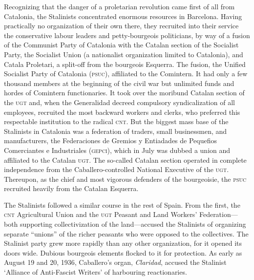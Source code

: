 Recognizing that the danger of a proletarian revolution came first of all from Catalonia, the Stalinists concentrated enormous resources in Barcelona. Having practically no organization of their own there, they recruited into their service the conservative labour leaders and petty-bourgeois politicians, by way of a fusion of the Communist Party of Catalonia with the Catalan section of the Socialist Party, the {Socialist Union} (a nationalist organization limited to Catalonia), and {Catala Proletari}, a split-off from the bourgeois Esquerra. The fusion, the {Unified Socialist Party of Catalonia} ({\textsc{psuc}}), affiliated to the Comintern. It had only a few thousand members at the beginning of the civil war but unlimited funds and hordes of Comintern functionaries. It took over the moribund Catalan section of the \textsc{ugt} and, when the Generalidad decreed compulsory syndicalization of all employees, recruited the most backward workers and clerks, who preferred this respectable institution to the radical \textsc{cnt}. But the biggest mass base of the Stalinists in Catalonia was a federation of traders, small businessmen, and manufacturers, the {Federaciones de Gremios y Entiadades de Pequefios Comerciantes e Industriales} ({\textsc{gepci}}), which in July was dubbed a union and affiliated to the Catalan \textsc{ugt}. The so-called Catalan section operated in complete independence from the Caballero-controlled National Executive of the \textsc{ugt}. Thereupon, as the chief and most vigorous defenders of the bourgeoisie, the \textsc{psuc} recruited heavily from the Catalan Esquerra.

The Stalinists followed a similar course in the rest of Spain. From the first, the {\textsc{cnt} Agricultural Union} and the {\textsc{ugt} Peasant and Land Workers’ Federation}---both supporting collectivization of the land---accused the Stalinists of organizing separate ``unions'' of the richer peasants who were opposed to the collectives. The Stalinist party grew more rapidly than any other organization, for it opened its doors wide. Dubious bourgeois elements flocked to it for protection. As early as August 19 and 20, 1936, Caballero’s organ, \emph{Claridad}, accused the Stalinist `Alliance of Anti-Fascist Writers' of harbouring reactionaries.

